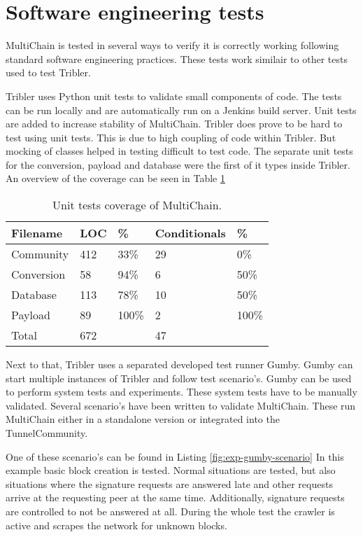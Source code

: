 \section{Software engineering tests}
MultiChain is tested in several ways to verify it is correctly working
following standard software engineering practices.
These tests work similair to other tests used to test Tribler.

Tribler uses Python unit tests  to validate small components of code.
The tests can be run locally and
are automatically run on a Jenkins build server\cite{jenkins}\cite{jenkins-tribler}.
Unit tests are added to increase stability of MultiChain.
Tribler does prove to be hard to test using unit tests.
This is due to high coupling of code within Tribler.
But mocking of classes helped in testing difficult to test code.
The separate unit tests for the conversion, payload and database were the first of it types inside Tribler.
An overview of the coverage can be seen in Table \ref{tab:tests}

\begin{table}
\centering
\begin{tabular}{l|ll|ll}
Filename   & LOC & \%    & Conditionals & \%    \\ \hline
Community  & 412 & 33\%  & 29           & 0\%   \\
Conversion & 58  & 94\%  & 6            & 50\%  \\
Database   & 113 & 78\%  & 10           & 50\%  \\
Payload    & 89  & 100\% & 2            & 100\% \\ \hline
Total      & 672 &       & 47           &
\end{tabular}
\caption{Unit tests coverage of MultiChain.}
\label{tab:tests}
\end{table}

Next to that, Tribler uses a separated developed test runner Gumby.
Gumby can start multiple instances of Tribler and follow test scenario's.
Gumby can be used to perform system tests and experiments.
These system tests have to be manually validated.
Several scenario's have been written to validate MultiChain.
These run MultiChain either in a standalone version or integrated into the TunnelCommunity.

One of these scenario's can be found in Listing \ref{fig:exp-gumby-scenario}
In this example basic block creation is tested.
Normal situations are tested,
but also situations where the signature requests are answered late
and other requests arrive at the requesting peer at the same time.
Additionally, signature requests are controlled to not be answered at all.
During the whole test the crawler is active and scrapes the network for unknown blocks.

